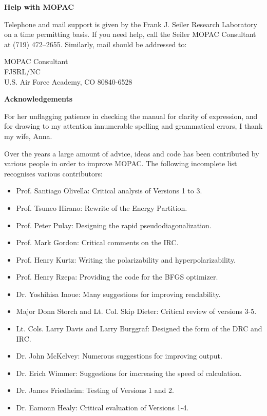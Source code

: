 \begin{center}{\Large\bf Help with MOPAC}\end{center}

  Telephone and mail support is given by the   
  Frank J. Seiler Research Laboratory on a time
  permitting basis.  If you need help, call    
  the Seiler MOPAC Consultant at (719) 472--2655.
  Similarly, mail should be addressed to:       
                                               
{\noindent MOPAC Consultant\\                      
          FJSRL/NC\\                              
          U.S. Air Force Academy, CO 80840-6528\\}
                                               
\newpage

\begin{center}{\Large\bf Acknowledgements}\end{center}

      For her unflagging patience in checking the manual for  clarity
 of  expression, and for drawing to my attention innumerable spelling
 and grammatical errors, I thank my wife, Anna.

      Over the years a large amount of advice,  ideas  and  code  has
 been  contributed  by various people in order to improve MOPAC.  The
 following incomplete list recognises various contributors:
\begin{itemize}
\item Prof. Santiago Olivella: Critical analysis of Versions 1 to 3.
\item Prof. Tsuneo Hirano: Rewrite of the Energy Partition.
\item  Prof. Peter Pulay: Designing the rapid pseudodiagonalization.
\item  Prof. Mark Gordon: Critical comments on the IRC.
\item  Prof. Henry Kurtz: Writing the polarizability and hyperpolarizability.
\item  Prof. Henry Rzepa: Providing the code for the BFGS optimizer.
\item  Dr. Yoshihisa Inoue: Many suggestions for improving readability.
\item  Major Donn Storch and Lt. Col. Skip Dieter: Critical review of versions 
 3-5.
\item  Lt. Cols. Larry Davis and Larry Burggraf: Designed the form
 of the DRC and IRC.
\item Dr. John McKelvey: Numerous suggestions for improving output.
\item Dr. Erich Wimmer: Suggestions for imcreasing the speed of calculation.
\item Dr. James Friedheim: Testing of Versions 1 and 2.
\item Dr. Eamonn Healy: Critical evaluation of Versions 1-4.
\end{itemize}
             
